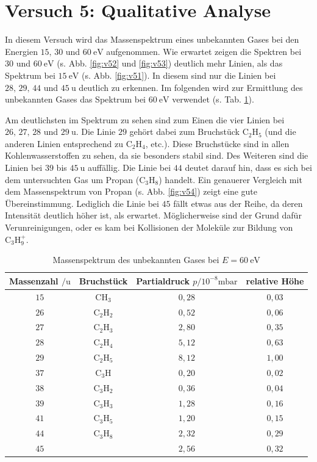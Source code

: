 \section{Versuch 5: Qualitative Analyse}

In diesem Versuch wird das Massenspektrum eines unbekannten Gases bei den Energien $15, \, 30$ und $\SI{60}{\electronvolt}$ aufgenommen. Wie erwartet zeigen die Spektren bei $30$ und $\SI{60}{\electronvolt}$ (s. Abb. \ref{fig:v52} und \ref{fig:v53}) deutlich mehr Linien, als das Spektrum bei $\SI{15}{\electronvolt}$ (s. Abb. \ref{fig:v51}).
In diesem sind nur die Linien bei $28, \, 29, \, 44$ und $\SI{45}{\amu}$ deutlich zu erkennen. Im folgenden wird zur Ermittlung des unbekannten Gases das Spektrum bei $\SI{60}{\electronvolt}$ verwendet (s. Tab. \ref{tab:v5}).

Am deutlichsten im Spektrum zu sehen sind zum Einen die vier Linien bei $26, \, 27, \, 28$ und $\SI{29}{\amu}$. Die Linie $29$ gehört dabei zum Bruchstück $\textrm{C}_{2}\textrm{H}_{5}$ (und die anderen Linien entsprechend zu $\textrm{C}_{2}\textrm{H}_{4}$, etc.).
Diese Bruchstücke sind in allen Kohlenwasserstoffen zu sehen, da sie besonders stabil sind. Des Weiteren sind die Linien bei $39$ bis $\SI{45}{\amu}$ auffällig. Die Linie bei $44$ deutet darauf hin, dass es sich bei dem untersuchten Gas um Propan ($\textrm{C}_{3}\textrm{H}_{8}$) handelt.
Ein genauerer Vergleich mit dem Massenspektrum von Propan (s. Abb. \ref{fig:v54}) zeigt eine gute Übereinstimmung. Lediglich die Linie bei $45$ fällt etwas aus der Reihe, da deren Intensität deutlich höher ist, als erwartet.
Möglicherweise sind der Grund dafür Verunreinigungen, oder es kam bei Kollisionen der Moleküle zur Bildung von $\textrm{C}_{3}\textrm{H}_{9}^{+}$.

\begin{table}[tb]
 \centering
 \caption{Massenspektrum des unbekannten Gases bei $E=\SI{60}{\electronvolt}$}
 \label{tab:v5}
 \begin{tabular}{cccc} \toprule
   Massenzahl $/\si{\amu}$ & Bruchstück & Partialdruck $p/10^{-8}\si{\milli \bar}$ & relative Höhe \\ \midrule
   $15$ & CH$_{3}$ & $0,28$ & $0,03$\\
   $26$ & C$_{2}$H$_{2}$ & $0,52$ & $0,06$ \\
   $27$ & C$_{2}$H$_{3}$ & $2,80$ & $0,35$ \\
   $28$ & C$_{2}$H$_{4}$ & $5,12$ & $0,63$ \\
   $29$ & C$_{2}$H$_{5}$ & $8,12$ & $1,00$ \\
   $37$ & C$_{3}$H & $0,20$ & $0,02$ \\
   $38$ & C$_{3}$H$_{2}$ & $0,36$ & $0,04$ \\
   $39$ & C$_{3}$H$_{3}$ & $1,28$ & $0,16$ \\
   $41$ & C$_{3}$H$_{5}$ & $1,20$ & $0,15$ \\
   $44$ & C$_{3}$H$_{8}$ & $2,32$ & $0,29$ \\
   $45$ & & $2,56$ & $0,32$ \\ \bottomrule
 \end{tabular}
\end{table}


